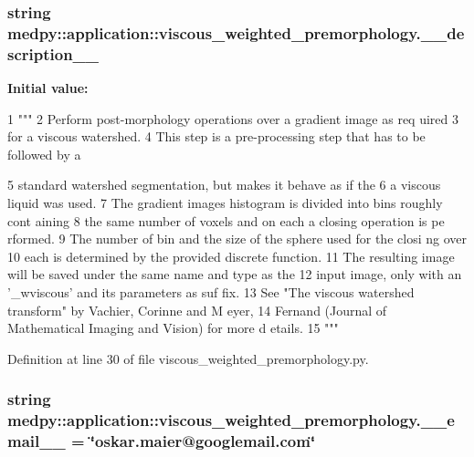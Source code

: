 \hypertarget{namespacemedpy_1_1application_1_1viscous__weighted__premorphology_a86ed5b3fbcc76345e47339be6ae007a8}{
\subsubsection[{\_\-\_\-description\_\-\_\-}]{\setlength{\rightskip}{0pt plus 5cm}string {\bf medpy::application::viscous\_\-weighted\_\-premorphology.\_\-\_\-description\_\-\_\-}}}
\label{namespacemedpy_1_1application_1_1viscous__weighted__premorphology_a86ed5b3fbcc76345e47339be6ae007a8}
{\bfseries Initial value:}
\begin{DoxyCode}
1 """
2                   Perform post-morphology operations over a gradient image as req
      uired
3                   for a viscous watershed.
4                   This step is a pre-processing step that has to be followed by a
      
5                   standard watershed segmentation, but makes it behave as if the
6                   a viscous liquid was used.
7                   The gradient images histogram is divided into bins roughly cont
      aining
8                   the same number of voxels and on each a closing operation is pe
      rformed.
9                   The number of bin and the size of the sphere used for the closi
      ng over
10                   each is determined by the provided discrete function.
11                   The resulting image will be saved under the same name and type 
      as the
12                   input image, only with an '_wviscous' and its parameters as suf
      fix.
13                   See "The viscous watershed transform" by Vachier, Corinne and M
      eyer,
14                   Fernand (Journal of Mathematical Imaging and Vision) for more d
      etails.
15                   """
\end{DoxyCode}


Definition at line 30 of file viscous\_\-weighted\_\-premorphology.py.

\hypertarget{namespacemedpy_1_1application_1_1viscous__weighted__premorphology_a983abeda72c63597deaa19c226a72cfe}{
\subsubsection[{\_\-\_\-email\_\-\_\-}]{\setlength{\rightskip}{0pt plus 5cm}string {\bf medpy::application::viscous\_\-weighted\_\-premorphology.\_\-\_\-email\_\-\_\-} = \char`\"{}oskar.maier@googlemail.com\char`\"{}}}
\label{namespacemedpy_1_1application_1_1viscous__weighted__premorphology_a983abeda72c63597deaa19c226a72cfe}


